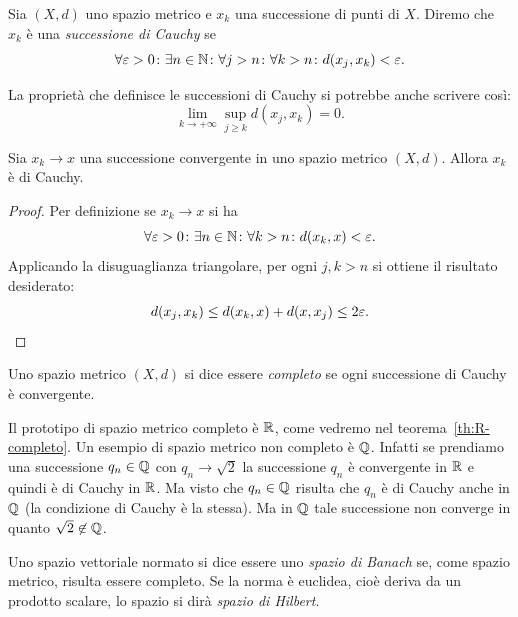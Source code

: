 \begin{definition}
\mymark{***}
Sia $(X,d)$ uno spazio metrico e $x_k$ una successione di punti di $X$.
Diremo che $x_k$ è una
\emph{successione di Cauchy}
se
\[
 \forall \varepsilon>0\colon \exists n\in {\mathbb N}\colon \forall j>n \colon \forall k > n \colon d(x_j,x_k) < \varepsilon.
\]
\end{definition}

La proprietà che definisce le successioni di Cauchy
si potrebbe anche scrivere così:
\[
  \lim_{k \to +\infty} \sup_{j\ge k} d(x_j, x_k) = 0.
\]

\begin{theorem}
\mymark{**}%
\label{th:se_converge_cauchy}
Sia $x_k\to x$ una successione convergente in uno spazio metrico $(X,d)$. Allora $x_k$ è di Cauchy.
\end{theorem}
%
\begin{proof}
\mymark{**}
Per definizione se $x_k \to x$ si ha
\[
  \forall \varepsilon>0\colon \exists n\in {\mathbb N} \colon
  \forall k>n \colon d(x_k,x)< \varepsilon.
\]
Applicando la disuguaglianza triangolare, per ogni $j,k>n$
si ottiene il risultato desiderato:
\[
  d(x_j, x_k) \le d(x_k,x) + d(x,x_j) \le 2\varepsilon.
\]
\end{proof}

\begin{definition}[completezza]
\mymark{***}
Uno spazio metrico $(X,d)$ si dice essere \emph{completo}%
se ogni successione di Cauchy è convergente.
\end{definition}

Il prototipo di spazio metrico completo è ${\mathbb R}$, come vedremo nel teorema~\ref{th:R-completo}.
Un esempio di spazio metrico non completo è ${\mathbb Q}$.
Infatti se prendiamo una
successione $q_n \in{\mathbb Q}$ con $q_n\to \sqrt 2$ la successione $q_n$ è convergente
in ${\mathbb R}$ e quindi è di Cauchy in ${\mathbb R}$. Ma visto che $q_n\in {\mathbb Q}$ risulta
che $q_n$ è di Cauchy anche in ${\mathbb Q}$ (la condizione di Cauchy è la stessa).
Ma in ${\mathbb Q}$ tale successione non converge in quanto $\sqrt 2\not \in {\mathbb Q}$.

\begin{definition}
Uno spazio vettoriale normato si dice essere uno
\emph{spazio di Banach}%
%
%
se, come spazio metrico, risulta essere completo.
Se la norma è euclidea, cioè deriva da un prodotto scalare, lo spazio si dirà
\emph{spazio di Hilbert}.
%
\end{definition}

